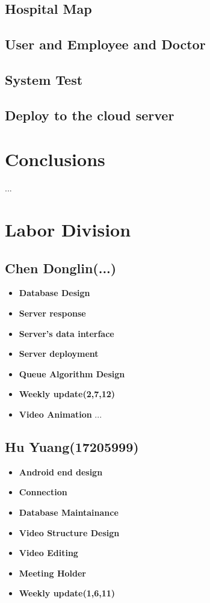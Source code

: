 \documentclass[a4paper]{article}
\begin{document}
\subsection{Hospital Map}

\subsection{User and Employee and Doctor}

\subsection{System Test}

\subsection{Deploy to the cloud server}

\section{Conclusions}

...
\section{Labor Division}
\newpage
\subsection{Chen Donglin(...)}
\begin{itemize}
    \item \textbf{Database Design}
    \item \textbf{Server response}
    \item \textbf{Server's data interface}
    \item \textbf{Server deployment}
     \item \textbf{Queue Algorithm Design}
      \item \textbf{Weekly update(2,7,12)}
      \item \textbf{Video Animation}
    ...
\end{itemize}
\subsection{Hu Yuang(17205999)}
\begin{itemize}
    \item \textbf{Android end design}
    \item \textbf{Connection}
    \item \textbf{Database Maintainance}
    \item \textbf{Video Structure Design}
    \item \textbf{Video Editing}
    \item \textbf{Meeting Holder}
    \item \textbf{Weekly update(1,6,11)}
\end{itemize}
\end{document}
